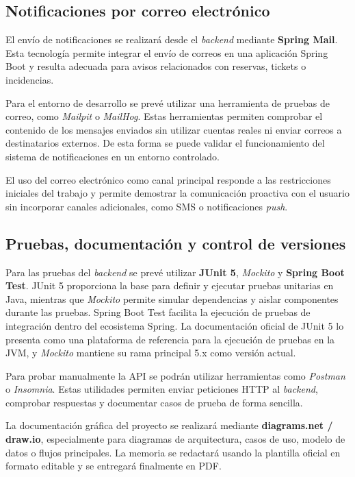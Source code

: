 \subsection{Notificaciones por correo electrónico}

El envío de notificaciones se realizará desde el \textit{backend} mediante \textbf{Spring Mail}. Esta tecnología permite integrar el envío de correos en una aplicación Spring Boot y resulta adecuada para avisos relacionados con reservas, tickets o incidencias.

Para el entorno de desarrollo se prevé utilizar una herramienta de pruebas de correo, como \textit{Mailpit} o \textit{MailHog}. Estas herramientas permiten comprobar el contenido de los mensajes enviados sin utilizar cuentas reales ni enviar correos a destinatarios externos. De esta forma se puede validar el funcionamiento del sistema de notificaciones en un entorno controlado.

El uso del correo electrónico como canal principal responde a las restricciones iniciales del trabajo y permite demostrar la comunicación proactiva con el usuario sin incorporar canales adicionales, como SMS o notificaciones \textit{push}.

\subsection{Pruebas, documentación y control de versiones}

Para las pruebas del \textit{backend} se prevé utilizar \textbf{JUnit 5}, \textit{Mockito} y \textbf{Spring Boot Test}. JUnit 5 proporciona la base para definir y ejecutar pruebas unitarias en Java, mientras que \textit{Mockito} permite simular dependencias y aislar componentes durante las pruebas. Spring Boot Test facilita la ejecución de pruebas de integración dentro del ecosistema Spring. La documentación oficial de JUnit 5 lo presenta como una plataforma de referencia para la ejecución de pruebas en la JVM, y \textit{Mockito} mantiene su rama principal 5.x como versión actual.

Para probar manualmente la API se podrán utilizar herramientas como \textit{Postman} o \textit{Insomnia}. Estas utilidades permiten enviar peticiones HTTP al \textit{backend}, comprobar respuestas y documentar casos de prueba de forma sencilla.

La documentación gráfica del proyecto se realizará mediante \textbf{diagrams.net / draw.io}, especialmente para diagramas de arquitectura, casos de uso, modelo de datos o flujos principales. La memoria se redactará usando la plantilla oficial en formato editable y se entregará finalmente en PDF.

